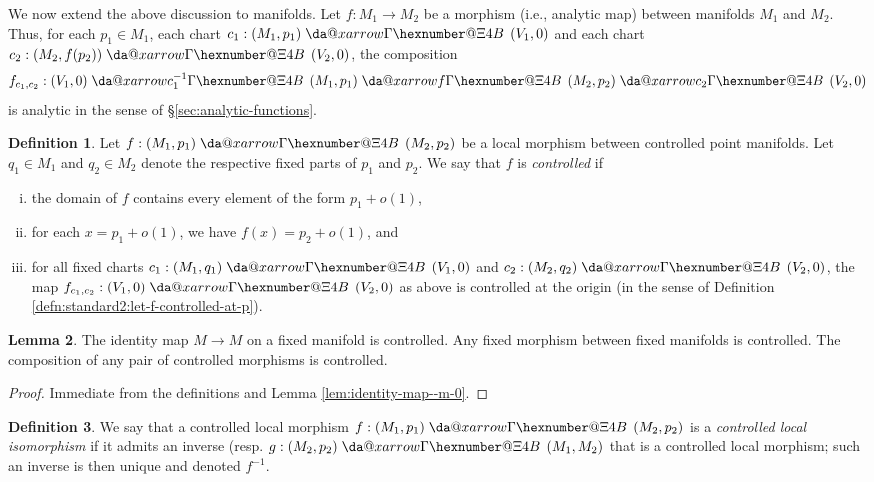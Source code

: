 \documentclass[reqno]{amsart}
\makeatletter
\newcommand*{\da@rightarrow}{\mathchar"0\hexnumber@\symAMSa 4B }
\newcommand*{\xdashrightarrow}[2][]{%
  \mathrel{%
    \mathpalette{\da@xarrow{#1}{#2}{}\da@rightarrow{\,}{}}{}%
  }%
}
\newcommand*{\da@xarrow}[7]{%
  \sbox0{$\ifx#7\scriptstyle\scriptscriptstyle\else\scriptstyle\fi#5#1#6\m@th$}%
  \sbox2{$\ifx#7\scriptstyle\scriptscriptstyle\else\scriptstyle\fi#5#2#6\m@th$}%
  \sbox4{$#7\dabar@\m@th$}%
  \dimen@=\wd0 %
  \ifdim\wd2 >\dimen@
    \dimen@=\wd2 %
  \fi
  \count@=2 %
  \def\da@bars{\dabar@\dabar@}%
  \@whiledim\count@\wd4<\dimen@\do{%
    \advance\count@\@ne
    \expandafter\def\expandafter\da@bars\expandafter{%
      \da@bars
      \dabar@ 
    }%
  }%
  \mathrel{#3}%
  \mathrel{%
    \mathop{\da@bars}\limits
    \ifx\\#1\\%
    \else
      _{\copy0}%
    \fi
    \ifx\\#2\\%
    \else
      ^{\copy2}%
    \fi
  }%
  \mathrel{#4}%
}
\theoremstyle{plain} \newtheorem{theorem} {Theorem}
\theoremstyle{definition} \newtheorem{definition} [theorem] {Definition}
\theoremstyle{itplain} %
\newtheorem{lemma}[theorem]{Lemma}
\numberwithin{equation}{section}
\numberwithin{theorem}{section}
\makeatother
\begin{document}
We now extend the above discussion to manifolds.  Let $f : M_1 \rightarrow M_2$ be a morphism (i.e., analytic map) between manifolds $M_1$ and $M_2$.  Thus, for each $p_1 \in M_1$, each chart $c_1 : (M_1, p_1) \xdashrightarrow{} (V_1, 0)$ and each chart $c_2 : (M_2, f(p_2)) \xdashrightarrow{} (V_2,0)$, the composition
\begin{equation*}
  f_{c_1,c_2} : (V_1,0) \xdashrightarrow{c_1^{-1}} (M_1, p_1) \xdashrightarrow{f} (M_2, p_2) \xdashrightarrow{c_2} (V_2,0)
\end{equation*}
is analytic in the sense of \S\ref{sec:analytic-functions}.


\begin{definition}\label{defn:standard2:f-controlled-M1-M2}
  Let $f : (M_1,p_1) \xdashrightarrow{} (M_2,p_2)$ be a local morphism between controlled point manifolds.  Let $q_1 \in M_1$ and $q_2 \in M_2$ denote the respective fixed parts of $p_1$ and $p_2$.  We say that $f$ is \emph{controlled} if
  \begin{enumerate}[(i)]
  \item the domain of $f$ contains every element of the form $p_1 + o(1)$,
  \item for each $x = p_1 + o(1)$, we have $f(x) = p_2 + o(1)$, and
  \item for all fixed charts $c_1 : (M_1,q_1) \xdashrightarrow{} (V_1,0)$ and $c_2 : (M_2, q_2) \xdashrightarrow{} (V_2,0)$, the map $f_{c_1,c_2} : (V_1,0) \xdashrightarrow{} (V_2,0)$ as above is controlled at the origin (in the sense of Definition \ref{defn:standard2:let-f-controlled-at-p}).
  \end{enumerate}
\end{definition}

\begin{lemma}\label{lem:identity-map-m}
  The identity map $M \rightarrow M$ on a fixed manifold is controlled.  Any fixed morphism between fixed manifolds is controlled.  The composition of any pair of controlled morphisms is controlled.
\end{lemma}
\begin{proof}
  Immediate from the definitions and Lemma \ref{lem:identity-map--m-0}.
\end{proof}

\begin{definition}
  We say that a controlled local morphism $f : (M_1, p_1) \xdashrightarrow{} (M_2, p_2)$ is a \emph{controlled local isomorphism} if it admits an inverse (resp. $g : (M_2, p_2) \xdashrightarrow{} (M_1, M_2)$ that is a controlled local morphism; such an inverse is then unique and denoted $f^{-1}$.  
\end{definition}
\end{document}
